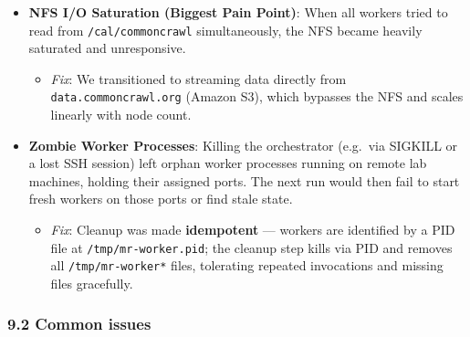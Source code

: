 \documentclass[
]{article}
\providecommand{\tightlist}{%
  \setlength{\itemsep}{0pt}\setlength{\parskip}{0pt}}
\begin{document}
\begin{itemize}
\tightlist
\item
  \textbf{NFS I/O Saturation (Biggest Pain Point)}: When all workers
  tried to read from \texttt{/cal/commoncrawl} simultaneously, the NFS
  became heavily saturated and unresponsive.

  \begin{itemize}
  \tightlist
  \item
    \emph{Fix}: We transitioned to streaming data directly from
    \texttt{data.commoncrawl.org} (Amazon S3), which bypasses the NFS
    and scales linearly with node count.
  \end{itemize}
\item
  \textbf{Zombie Worker Processes}: Killing the orchestrator (e.g.\ via
  SIGKILL or a lost SSH session) left orphan worker processes running on
  remote lab machines, holding their assigned ports. The next run would
  then fail to start fresh workers on those ports or find stale state.

  \begin{itemize}
  \tightlist
  \item
    \emph{Fix}: Cleanup was made \textbf{idempotent} --- workers are
    identified by a PID file at \texttt{/tmp/mr-worker.pid}; the cleanup
    step kills via PID and removes all \texttt{/tmp/mr-worker*} files,
    tolerating repeated invocations and missing files gracefully.
  \end{itemize}
\end{itemize}

\subsubsection{9.2 Common issues}\label{common-issues}
\end{document}
